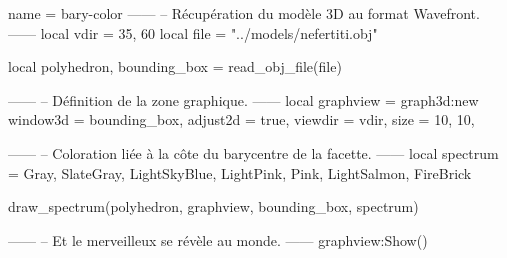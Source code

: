 \documentclass{standalone}
\begin{document}
\begin{luadraw}{name = bary-color}
------
-- Récupération du modèle 3D au format Wavefront.
------
local vdir = {35, 60}
local file = "../models/nefertiti.obj"

local polyhedron, bounding_box = read_obj_file(file)

------
-- Définition de la zone graphique.
------
local graphview = graph3d:new{
  window3d = bounding_box,
  adjust2d = true,
  viewdir  = vdir,
  size     = {10, 10},
}

------
-- Coloration liée à la côte du barycentre de la facette.
------
local spectrum = {Gray, SlateGray, LightSkyBlue, LightPink, Pink, LightSalmon, FireBrick}

draw_spectrum(polyhedron, graphview, bounding_box, spectrum)

------
-- Et le merveilleux se révèle au monde.
------
graphview:Show()
\end{luadraw}
\end{document}
